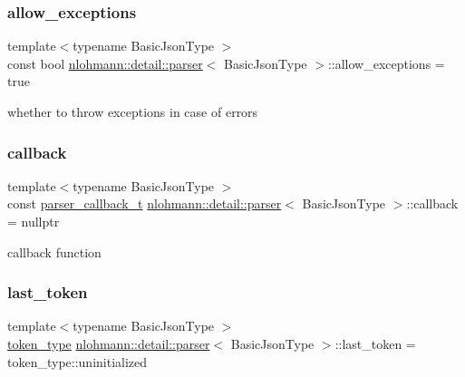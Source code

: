 \subsubsection{\texorpdfstring{allow\+\_\+exceptions}{allow\_exceptions}}
{\footnotesize\ttfamily template$<$typename Basic\+Json\+Type $>$ \\
const bool \hyperlink{classnlohmann_1_1detail_1_1parser}{nlohmann\+::detail\+::parser}$<$ Basic\+Json\+Type $>$\+::allow\+\_\+exceptions = true\hspace{0.3cm}{\ttfamily [private]}}



whether to throw exceptions in case of errors 

\mbox{\label{classnlohmann_1_1detail_1_1parser_a7600d272ec605e3ffdc8512b3585f476}} 
\subsubsection{\texorpdfstring{callback}{callback}}
{\footnotesize\ttfamily template$<$typename Basic\+Json\+Type $>$ \\
const \hyperlink{classnlohmann_1_1detail_1_1parser_ad250ad4f2b4af4a497e727c963162ff1}{parser\+\_\+callback\+\_\+t} \hyperlink{classnlohmann_1_1detail_1_1parser}{nlohmann\+::detail\+::parser}$<$ Basic\+Json\+Type $>$\+::callback = nullptr\hspace{0.3cm}{\ttfamily [private]}}



callback function 

\mbox{\label{classnlohmann_1_1detail_1_1parser_a932e49f6f4d291557846744319245994}} 
\subsubsection{\texorpdfstring{last\+\_\+token}{last\_token}}
{\footnotesize\ttfamily template$<$typename Basic\+Json\+Type $>$ \\
\hyperlink{classnlohmann_1_1detail_1_1parser_a21d247111b332785b7acf3f8e487d117}{token\+\_\+type} \hyperlink{classnlohmann_1_1detail_1_1parser}{nlohmann\+::detail\+::parser}$<$ Basic\+Json\+Type $>$\+::last\+\_\+token = token\+\_\+type\+::uninitialized\hspace{0.3cm}{\ttfamily [private]}}



